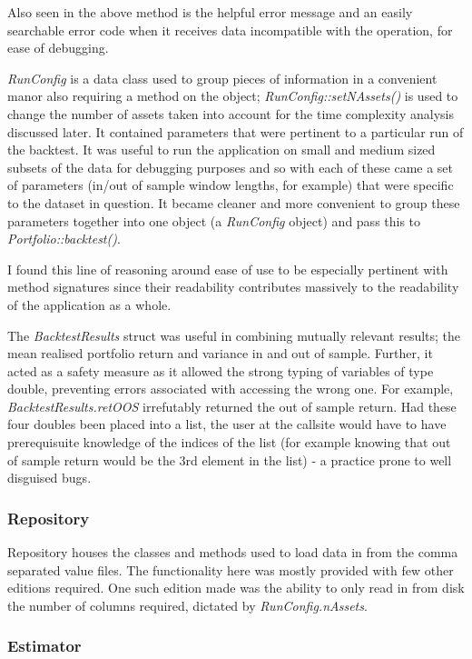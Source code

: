 \documentclass{article}
\begin{document}
Also seen in the above method is the helpful error message and an easily searchable error code when it receives data incompatible with the operation, for ease of debugging.

\textit{RunConfig} is a data class used to group pieces of information in a convenient manor also requiring a method on the object; \textit{RunConfig::setNAssets()} is used to change the number of assets taken into account for the time complexity analysis discussed later. It contained parameters that were pertinent to a particular run of the backtest. It was useful to run the application on small and medium sized subsets of the data for debugging purposes and so with each of these came a set of parameters (in/out of sample window lengths, for example) that were specific to the dataset in question. It became cleaner and more convenient to group these parameters together into one object (a \textit{RunConfig} object) and pass this to \textit{Portfolio::backtest()}.  

I found this line of reasoning around ease of use to be especially pertinent with method signatures since their readability contributes massively to the readability of the application as a whole.  

The \textit{BacktestResults} struct was useful in combining mutually relevant results; the mean realised portfolio return and variance in and out of sample. Further, it acted as a safety measure as it allowed the strong typing of variables of type double, preventing errors associated with accessing the wrong one. For example, \textit{BacktestResults.retOOS} irrefutably returned the out of sample return. Had these four doubles been placed into a list, the user at the callsite would have to have prerequisuite knowledge of the indices of the list (for example knowing that out of sample return would be the 3rd element in the list) - a practice prone to well disguised bugs.

\subsubsection{Repository}
\label{sec:repository}

Repository houses the classes and methods used to load data in from the comma separated value files. The functionality here was mostly provided with few other editions required. One such edition made was the ability to only read in from disk the number of columns required, dictated by \textit{RunConfig.nAssets}.


\subsubsection{Estimator}
\label{sec:parameter_estimation}
\end{document}

